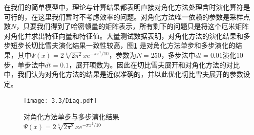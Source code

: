 在我们的简单模型中，理论与计算结果都表明直接对角化方法处理含时演化算符是可行的，在这里我们暂时不考虑效率的问题。对角化方法唯一依赖的参数是采样点数$N$，只要我们得到了哈密顿量的矩阵表示，所有剩下的问题只是将这个厄米矩阵对角化并求出特征向量和特征值。大量测试数据表明，对角化方法的演化结果和多步短步长切比雪夫演化结果一致性较高，图\ref{fig:Diag_evo} 是对角化方法单步和多步演化的结果，其中$\Psi(x) = 2 \sqrt[4]{2\pi^2}x e^{-\pi x^2 /10}$，参数为$N=250$，多步法中$dt=0.01$演化10步，单步法中$dt=0.1$，展开项数为。因此在切比雪夫展开和对角化方法的对比中，我们认为对角化方法的结果是近似准确的，并以此优化切比雪夫展开的参数设定。

\begin{figure}[hbt]
  \centering
  \captionsetup{justification=centering}
  \vspace{-1mm}
  \texttt{[image: 3.3/Diag.pdf]}
  \caption{对角化方法单步与多步演化结果 \\
            $\Psi(x) = 2 \sqrt[4]{2\pi^2}x e^{-\pi x^2 /10}$}
  \label{fig:Diag_evo}
\end{figure}

